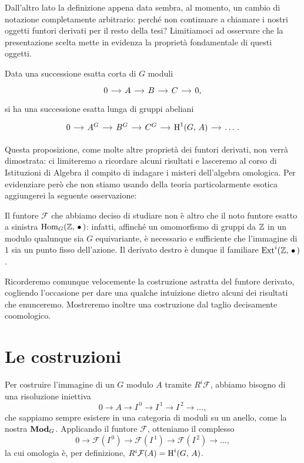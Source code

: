 Dall'altro lato la definizione appena data sembra, al momento, un cambio di notazione completamente arbitrario: perché non continuare a chiamare i nostri oggetti funtori derivati per il resto della tesi? Limitiamoci ad osservare che la presentazione scelta mette in evidenza la proprietà fondamentale di questi oggetti.

\begin{theorem}
	Data una successione esatta corta di $ G $ moduli
	\[\begin{tikzcd}[column sep = small]
	0 \rar & A \rar & B \rar & C \rar & 0,
	\end{tikzcd}\]
	si ha una successione esatta lunga di gruppi abeliani
	\[\begin{tikzcd}[column sep = small]
	0 \rar & A^G \rar & B^G \rar & C^G \rar & \HH^1(G, \, A) \rar & \dots \, .
	\end{tikzcd}\]
\end{theorem}

Questa proposizione, come molte altre proprietà dei funtori derivati, non verrà dimostrata: ci limiteremo a ricordare alcuni risultati e lasceremo al corso di Istituzioni di Algebra il compito di indagare i misteri dell'algebra omologica. Per evidenziare però che non stiamo usando della teoria particolarmente esotica aggiungerei la seguente osservazione:

\begin{remark}
	Il funtore $ \mathcal{F} $ che abbiamo deciso di studiare non è altro che il noto funtore esatto a sinistra $ \operatorname{Hom}_G(\mathbb{Z},\, \bullet\,) $: infatti, affinché un omomorfismo di gruppi da $ \mathbb{Z} $ in un modulo qualunque sia $ G $ equivariante, è necessario e sufficiente che l'immagine di $ 1 $ sia un punto fisso dell'azione. Il derivato destro è dunque il familiare $ \operatorname{Ext}^i(\mathbb{Z}, \, \bullet\,) $.
\end{remark}

Ricorderemo comunque velocemente la costruzione astratta del funtore derivato, cogliendo l'occasione per dare una qualche intuizione dietro alcuni dei risultati che enunceremo. Mostreremo inoltre una costruzione dal taglio decisamente coomologico.

\section{Le costruzioni}
Per costruire l'immagine di un $ G $ modulo $ A $ tramite $ R^i\mathcal{F} $, abbiamo bisogno di una risoluzione iniettiva
\[ 0 \to A \to I^{\,0} \to I^{\,1} \to I^{\,2} \to \dots, \]
che sappiamo sempre esistere in una categoria di moduli su un anello, come la nostra $ \mathbf{Mod}_G $. Applicando il funtore $ \mathcal{F} $, otteniamo il complesso
\[ 0 \to \mathcal{F}\left(I^{\,0}\right) \to \mathcal{F}\left(I^{\,1}\right) \to \mathcal{F}\left(I^{\,2}\right) \to \dots, \]
la cui omologia è, per definizione, $ R^i\mathcal{F}(A) = \operatorname{H}^i(G, \, A) $. \\

